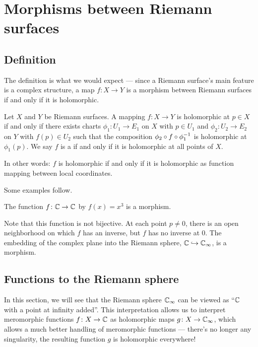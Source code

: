 \chapter{Morphisms between Riemann surfaces}
\label{ch:morphism_riemann}

\section{Definition}

The definition is what we would expect --- since a Riemann surface's main feature is a
complex structure, a map $f \colon X \to Y$ is a morphism between Riemann surfaces
if and only if it is holomorphic.

\begin{definition}
	\label{def:riemann_surface_morphism}
	Let $X$ and $Y$ be Riemann surfaces. A mapping $f \colon X \to Y$ is holomorphic at $p \in X$ if
	and only if there exists charts $\phi_1 \colon U_1 \to E_1$ on $X$ with $p \in U_1$ and $\phi_2
	\colon U_2 \to E_2$ on $Y$ with $f(p) \in U_2$ such that the composition $\phi_2 \circ f \circ
	\phi_1^{-1}$ is holomorphic at $\phi_1(p)$. We say $f$ is a  if and only if it is holomorphic at all points of $X$.
\end{definition}

In other words: $f$ is holomorphic if and only if it is holomorphic as function mapping
between local coordinates.

\begin{example}
	Some examples follow.
	\begin{itemize}
		\ii The function $f \colon \mathbb C \to \mathbb C$ by $f(x) = x^3$ is a morphism.

		Note that this function is not bijective. At each point $p \neq 0$, there is an open
		neighborhood on which $f$ has an inverse, but $f$ has no inverse at $0$.
		\ii The embedding of the complex plane into the Riemann sphere, $\mathbb C \hookrightarrow \mathbb C_\infty$, is
		a morphism.
	\end{itemize}
\end{example}

\section{Functions to the Riemann sphere}

In this section, we will see that the Riemann sphere $\mathbb C_\infty$ can be viewed as ``$\mathbb C$ with a
point at infinity added''. This interpretation allows us to interpret meromorphic functions $f
\colon X \to \mathbb C$ as holomorphic maps $g \colon X \to \mathbb C_\infty$, which allows a much better
handling of meromorphic functions --- there's no longer any singularity, the resulting function
$g$ is holomorphic everywhere!

